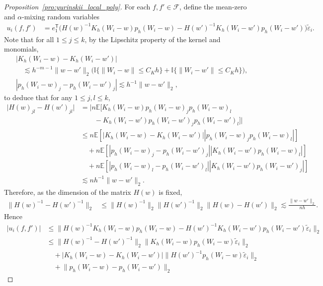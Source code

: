 \documentclass[11pt,lof]{puthesis}
\newcommand{\E}{\ensuremath{\mathbb{E}}}
\newcommand{\I}{\ensuremath{\mathbb{I}}}
\newcommand{\cF}{\ensuremath{\mathcal{F}}}
\newcommand{\T}{\ensuremath{\mathsf{T}}}
\theoremstyle{break}
\theoremstyle{proof}
\newtheorem{proof}{Proof}
\begin{document}
\begin{proof}[Proposition~\ref{pro:yurinskii_local_poly}]
For each $f, f' \in \cF$,
define the mean-zero and $\alpha$-mixing random variables
%
\begin{align*}
u_i(f,f')
&=
e_1^\T
\big(
H(w)^{-1} K_h(W_i-w) p_h(W_i-w)
- H(w')^{-1} K_h(W_i-w') p_h(W_i-w')
\big)
\tilde\varepsilon_i.
\end{align*}
%
Note that for all $1 \leq j \leq k$,
by the Lipschitz property of the kernel and monomials,
%
\begin{align*}
&\left|
K_h(W_i-w) - K_h(W_i-w')
\right| \\
&\quad\lesssim
h^{-m-1}
\|w-w'\|_2
\big(
\I\{\|W_i-w\| \leq C_K h\}
+ \I\{\|W_i-w'\| \leq C_K h\}
\big), \\
&\left|
p_h(W_i-w)_j - p_h(W_i-w')_j
\right|
\lesssim
h^{-1}
\|w-w'\|_2,
\end{align*}
%
to deduce that for any $1 \leq j,l \leq k$,
%
\begin{align*}
\big| H(w)_{j l} - H(w')_{j l} \big|
&=
\big|
n \E\big[
K_h(W_i-w) p_h(W_i-w)_j p_h(W_i-w)_l \\
&\qquad-
K_h(W_i-w') p_h(W_i-w')_j p_h(W_i-w')_l
\big]
\big| \\
&\leq
n\E\left[
\left|
K_h(W_i-w) - K_h(W_i-w')
\right|
\left|
p_h(W_i-w)_j
p_h(W_i-w)_l
\right|
\right] \\
&\quad+
n\E\left[
\left|
p_h(W_i-w)_j - p_h(W_i-w')_j
\right|
\left|
K_h(W_i-w')
p_h(W_i-w)_l
\right|
\right] \\
&\quad+
n\E\left[
\left|
p_h(W_i-w)_l - p_h(W_i-w')_l
\right|
\left|
K_h(W_i-w')
p_h(W_i-w')_j
\right|
\right] \\
&\lesssim
n h^{-1}\|w-w'\|_2.
\end{align*}
%
Therefore, as the dimension of the matrix $H(w)$ is fixed,
%
\begin{align*}
\big\| H(w)^{-1} - H(w')^{-1} \big\|_2
&\leq
\big\| H(w)^{-1}\big\|_2
\big\| H(w')^{-1}\big\|_2
\big\| H(w) - H(w') \big\|_2
\lesssim
\frac{\|w-w'\|_2}{n h}.
\end{align*}
%
Hence
%
\begin{align*}
\big| u_i(f,f') \big|
&\leq
\big\|
H(w)^{-1} K_h(W_i-w) p_h(W_i-w)
- H(w')^{-1} K_h(W_i-w') p_h(W_i-w')
\tilde\varepsilon_i
\big\|_2 \\
&\leq
\big\| H(w)^{-1} - H(w')^{-1} \big\|_2
\big\| K_h(W_i-w) p_h(W_i-w)
\tilde\varepsilon_i
\big\|_2 \\
&\quad+
\big| K_h(W_i-w) - K_h(W_i-w') \big|
\big\| H(w')^{-1} p_h(W_i-w)
\tilde\varepsilon_i
\big\|_2 \\
&\quad+
\big\| p_h(W_i-w) - p_h(W_i-w') \big\|_2

\end{align*}
\end{proof}
\end{document}
